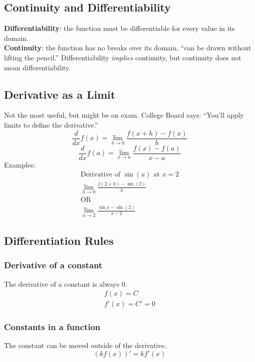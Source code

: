 \documentclass[12pt]{article}
\begin{document}
        \subsection{Continuity and Differentiability}
            \textbf{Differentiability}: the function must be differentiable for every value in its domain.
            \\ \textbf{Continuity}: the function has no breaks over its domain, ``can be drawn without lifting the pencil.''
            \newline
            Differentiability \textit{implies} continuity, but continuity does not mean differentiability.

        \subsection{Derivative as a Limit}
            Not the most useful, but might be on exam. College Board says: ``You'll apply limits to define the derivative.''
            \[ \frac{d}{dx} f(x) = \lim_{h \to 0} \frac{f(x+h) - f(x)}{h} \]
            \[ \frac{d}{dx} f(a) = \lim_{x \to a} \frac{f(x) - f(a)}{x-a} \]
            \newline
            Examples:
            \begin{gather*}
                \text{Derivative of $\sin{(x)}$ at $x=2$} \\
                \lim_{h \to 0} \frac{f(2+h) - \sin{(2)}}{h} \\
                \text{OR} \\
                \lim_{x \to 2} \frac{\sin{x} - \sin{(2)}}{x-2}
            \end{gather*}

        \subsection{Differentiation Rules}
            \subsubsection{Derivative of a constant}
                The derivative of a constant is always $0$.
                \begin{gather*}
                    f(x) = C \\
                    f'(x) = C' = 0
                \end{gather*}

            \subsubsection{Constants in a function}
                The constant can be moved outside of the derivative.
                \[ \left( k f(x) \right)' = k f'(x) \]
\end{document}
